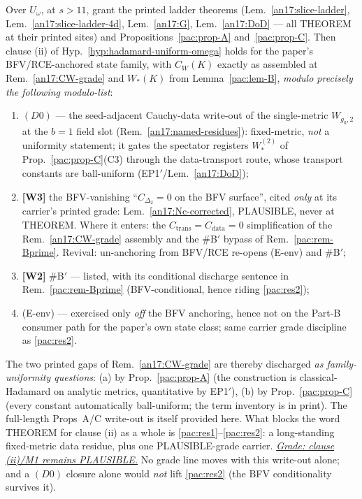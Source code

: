 \begin{theorem}\label{pac:thm-verdict}
Over $U_\omega$, at $s>11$, grant the printed ladder theorems
(Lem.~\ref{an17:slice-ladder}, Lem.~\ref{an17:slice-ladder-4d}, Lem.~\ref{an17:G}, Lem.~\ref{an17:DoD} --- all
THEOREM at their printed sites) and
Propositions~\ref{pac:prop-A} and~\ref{pac:prop-C}. Then clause (ii)
of Hyp.~\ref{hyp:hadamard-uniform-omega} holds for the paper's
BFV/RCE-anchored state family, with $C_W(K)$ exactly as assembled at
Rem.~\ref{an17:CW-grade} and $W_*(K)$ from
Lemma~\ref{pac:lem-B}, \emph{modulo precisely the following
modulo-list}:
\begin{enumerate}[label=\textup{(res\arabic*)},leftmargin=*,nosep]
\item\label{pac:res1} $(D0)$ --- the seed-adjacent Cauchy-data
  write-out of the single-metric $W_{g_0,2}$ at the $b{=}1$ field slot
  (Rem.~\ref{an17:named-residues}): fixed-metric, \emph{not} a
  uniformity statement; it gates the spectator registers
  $W^{(2)}_*$ of Prop.~\ref{pac:prop-C}(C3) through the data-transport
  route, whose transport constants are ball-uniform (EP1$'$/Lem.~\ref{an17:DoD});
\item\label{pac:res2} \textbf{[W3]} the BFV-vanishing
  ``$C_{\Delta_2}=0$ on the BFV surface'', cited \emph{only} at its
  carrier's printed grade: Lem.~\ref{an17:Nc-corrected}, PLAUSIBLE, never
  at THEOREM. Where it enters: the
  $C_{\mathrm{trans}}=C_{\mathrm{data}}=0$ simplification of the
  Rem.~\ref{an17:CW-grade} assembly and the \#B$'$ bypass of
  Rem.~\ref{pac:rem-Bprime}. Revival: un-anchoring from BFV/RCE
  re-opens (E-env) and \#B$'$;
\item\label{pac:res3} \textbf{[W2]} \#B$'$ --- listed, with its
  conditional discharge sentence in Rem.~\ref{pac:rem-Bprime}
  (BFV-conditional, hence riding \ref{pac:res2});
\item\label{pac:res4} (E-env) --- exercised only \emph{off} the BFV
  anchoring, hence not on the Part-B consumer path for the paper's own
  state class; same carrier grade discipline as \ref{pac:res2}.
\end{enumerate}
The two printed gaps of Rem.~\ref{an17:CW-grade} are thereby discharged \emph{as
family-uniformity questions}: (a) by Prop.~\ref{pac:prop-A} (the
construction is classical-Hadamard on analytic metrics, quantitative
by EP1$'$), (b) by Prop.~\ref{pac:prop-C} (every constant
automatically ball-uniform; the term inventory is in print). The
full-length Props~A/C write-out is itself provided here. What blocks the word THEOREM
for clause (ii) as a whole is \ref{pac:res1}--\ref{pac:res2}: a
long-standing fixed-metric data residue, plus one PLAUSIBLE-grade carrier. \emph{\underline{Grade:
clause (ii)/M1 remains PLAUSIBLE.}} No grade line moves with this
write-out alone; and a $(D0)$ closure alone would \emph{not} lift
\ref{pac:res2} (the BFV conditionality survives it).
\end{theorem}

